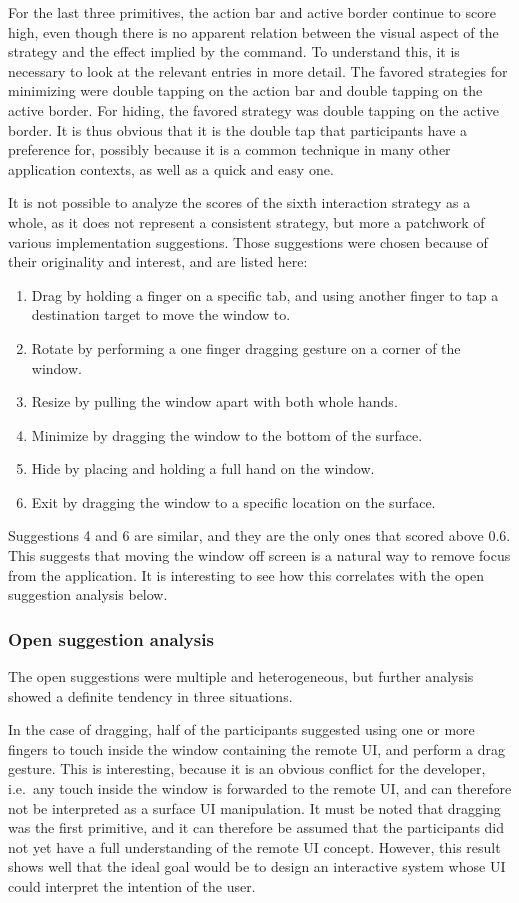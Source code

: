 For the last three primitives, the action bar and active border continue to score high, even though there is no apparent relation between the visual aspect of the strategy and the effect implied by the command.
To understand this, it is necessary to look at the relevant entries in more detail.
The favored strategies for minimizing were double tapping on the action bar and double tapping on the active border.
For hiding, the favored strategy was double tapping on the active border.
It is thus obvious that it is the double tap that participants have a preference for, possibly because it is a common technique in many other application contexts, as well as a quick and easy one.

It is not possible to analyze the scores of the sixth interaction strategy as a whole, as it does not represent a consistent strategy, but more a patchwork of various implementation suggestions.
Those suggestions were chosen because of their originality and interest, and are listed here:
\begin{enumerate}
\item Drag by holding a finger on a specific tab, and using another finger to tap a destination target to move the window to.
\item Rotate by performing a one finger dragging gesture on a corner of the window.
\item Resize by pulling the window apart with both whole hands.
\item Minimize by dragging the window to the bottom of the surface.
\item Hide by placing and holding a full hand on the window.
\item Exit by dragging the window to a specific location on the surface.
\end{enumerate}
Suggestions 4 and 6 are similar, and they are the only ones that scored above 0.6.
This suggests that moving the window off screen is a natural way to remove focus from the application.
It is interesting to see how this correlates with the open suggestion analysis below.

\subsubsection{Open suggestion analysis}

The open suggestions were multiple and heterogeneous, but further analysis showed a definite tendency in three situations.

In the case of dragging, half of the participants suggested using one or more fingers to touch inside the window containing the remote UI, and perform a drag gesture.
This is interesting, because it is an obvious conflict for the developer, i.e.\ any touch inside the window is forwarded to the remote UI, and can therefore not be interpreted as a surface UI manipulation.
It must be noted that dragging was the first primitive, and it can therefore be assumed that the participants did not yet have a full understanding of the remote UI concept.
However, this result shows well that the ideal goal would be to design an interactive system whose UI could interpret the intention of the user.


